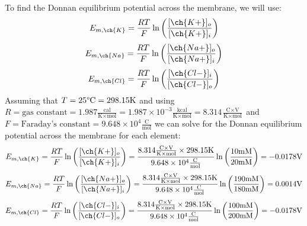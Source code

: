 \documentclass[11pt]{article}
\begin{document}
\begin{enumerate}[label=\arabic*.]
To find the Donnan equilibrium potential across the membrane, we will use:
\begin{align*}
E_{m, \ch{K}} = \frac{RT} {F} \ln{\left(\frac{[\ch{K+}]_o} {[\ch{K+}]_i}\right)}
\end{align*}
\begin{align*}
E_{m, \ch{Na}} = \frac{RT} {F} \ln{\left(\frac{[\ch{Na+}]_o} {[\ch{Na+}]_i}\right)}
\end{align*}
\begin{align*}
E_{m, \ch{Cl}} = \frac{RT} {F} \ln{\left(\frac{[\ch{Cl-}]_i} {[\ch{Cl-}]_o}\right)}
\end{align*}
Assuming that $T = 25\text{\degree C} = 298.15 \text{K}$ and using $R = \text{gas constant} = 1.987 \frac{\text{cal}}{\text{K} \times \text{mol}} = 1.987 \times 10^{-3} \frac{\text{kcal}}{\text{K} \times \text{mol}} = 8.314 \frac{\text{C} \times \text{V}} {\text{K} \times \text{mol}}$ and $F = \text{Faraday's constant} = 9.648 \times 10^4 \frac{\text{C}} {\text{mol}}$ we can solve for the Donnan equilibrium potential across the membrane for each element:
\begin{align*}
E_{m, \ch{K}} = \frac{RT} {F} \ln{\left(\frac{[\ch{K+}]_o} {[\ch{K+}]_i}\right)} = \frac{{8.314 \frac{\text{C} \times \text{V}} {\text{K} \times \text{mol}}} \times {298.15 \text{K}}} {9.648 \times 10^4 \frac{\text{C}} {\text{mol}}} \ln{\left(\frac{10\text{mM}} {20\text{mM}}\right)} = -0.0178\text{V}
\end{align*}
\begin{align*}
E_{m, \ch{Na}} = \frac{RT} {F} \ln{\left(\frac{[\ch{Na+}]_o} {[\ch{Na+}]_i}\right)} = \frac{{8.314 \frac{\text{C} \times \text{V}} {\text{K} \times \text{mol}}} \times {298.15 \text{K}}} {9.648 \times 10^4 \frac{\text{C}} {\text{mol}}} \ln{\left(\frac{190\text{mM}} {180\text{mM}}\right)} =  0.0014\text{V}
\end{align*}
\begin{align*}
E_{m, \ch{Cl}} = \frac{RT} {F} \ln{\left(\frac{[\ch{Cl-}]_i} {[\ch{Cl-}]_o}\right)} = \frac{{8.314 \frac{\text{C} \times \text{V}} {\text{K} \times \text{mol}}} \times {298.15 \text{K}}} {9.648 \times 10^4 \frac{\text{C}} {\text{mol}}} \ln{\left(\frac{100\text{mM}} {200\text{mM}}\right)} = -0.0178\text{V}
\end{align*}



\end{enumerate}
\end{document}
